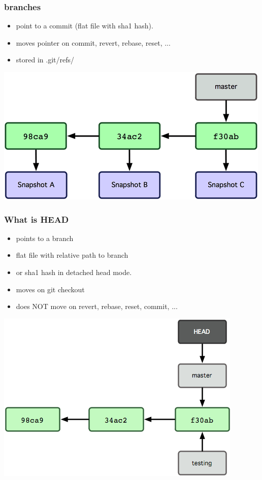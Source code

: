 \begin{frame}
	\frametitle{branches}

	\begin{block}{}
		\begin{itemize}
			\item point to a commit (flat file with sha1 hash).
			\item moves pointer on commit, revert, rebase, reset, ...
			\item stored in .git/refs/
		\end{itemize}
	\end{block}
\end{frame}

\begin{frame}
	\includegraphics[width=\textwidth]{images/branches.png}
\end{frame}

\begin{frame}
	\frametitle{What is HEAD}

	\begin{block}{}
		\begin{itemize}
			\item points to a branch
			\item flat file with relative path to branch
			\item or sha1 hash in detached head mode.
			\item moves on git checkout
			\item does NOT move on revert, rebase, reset, commit, ...
		\end{itemize}
	\end{block}
\end{frame}

\begin{frame}
	\includegraphics[width=\textwidth]{images/head.png}
\end{frame}

